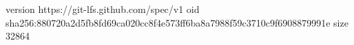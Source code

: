 version https://git-lfs.github.com/spec/v1
oid sha256:880720a2d5fb8fd69ca020cc8f4e573ff6ba8a7988f59c3710c9f6908879991e
size 32864
